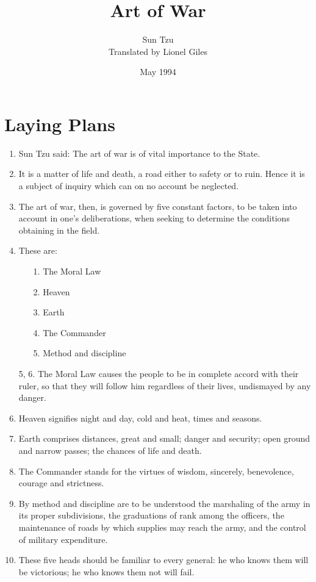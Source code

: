 \documentclass[oneside]{book}
\title{Art of War}
\author{Sun Tzu\\Translated by Lionel Giles}
\date{May 1994}
\begin{document}
\maketitle

\chapter{Laying Plans}
\begin{enumerate}
    \item Sun Tzu said: The art of war is of vital importance to the State.
    \item It is a matter of life and death, a road either to safety or to ruin. Hence it is a subject of inquiry which can on no account be neglected.
    \item The art of war, then, is governed by five constant factors, to be taken into account in one's deliberations, when seeking to determine the conditions obtaining in the field.
    \item These are: \begin{enumerate}
        \item[1.] The Moral Law
        \item[2.] Heaven
        \item[3.] Earth
        \item[4.] The Commander
        \item[5.] Method and discipline
    \end{enumerate}
    \item[5, 6.] The Moral Law causes the people to be in complete accord with their ruler, so that they will follow him regardless of their lives, undismayed by any danger.
	\setcounter{enumi}{6}
    \item Heaven signifies night and day, cold and heat, times and seasons.
    \item Earth comprises distances, great and small; danger and security; open ground and narrow passes; the chances of life and death.
    \item The Commander stands for the virtues of wisdom, sincerely, benevolence, courage and strictness.
    \item By method and discipline are to be understood the marshaling of the army in its proper subdivisions, the graduations of rank among the officers, the maintenance of roads by which supplies may reach the army, and the control of military expenditure.
    \item These five heads should be familiar to every general: he who knows them will be victorious; he who knows them not will fail.

\end{enumerate}
\end{document}

